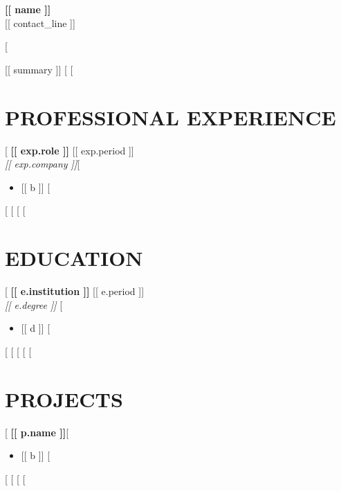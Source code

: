 \documentclass[letterpaper,11pt]{article}
\begin{document}
\begin{center}
    {\LARGE \textbf{[[ name ]]}}\\[3pt]
    \small [[ contact_line ]]
\end{center}
[%

[[ summary ]]
\vspace{4pt}
[%
[%

\section{PROFESSIONAL EXPERIENCE}
[%
\textbf{[[ exp.role ]]} \hfill [[ exp.period ]]\\
\textit{[[ exp.company ]]}[%
\begin{itemize}
[%
  \item \small{[[ b ]]}
[%
\end{itemize}
[%
[%
[%
[%

\section{EDUCATION}
[%
\textbf{[[ e.institution ]]} \hfill [[ e.period ]]\\
\textit{[[ e.degree ]]}
[%
\begin{itemize}
[%
  \item \small{[[ d ]]}
[%
\end{itemize}
[%
[%
[%
[%
[%

\section{PROJECTS}
[%
\textbf{[[ p.name ]]}[%
\begin{itemize}
[%
  \item \small{[[ b ]]}
[%
\end{itemize}
[%
[%
[%
[%
\end{document}
